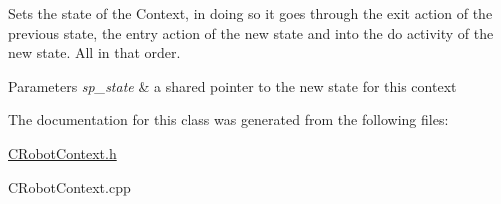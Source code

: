Sets the state of the Context, in doing so it goes through the exit action of the previous state, the entry action of the new state and into the do activity of the new state. All in that order. 


\begin{DoxyParams}{Parameters}
{\em sp\+\_\+state} & a shared pointer to the new state for this context \\
\hline
\end{DoxyParams}


The documentation for this class was generated from the following files\+:\begin{DoxyCompactItemize}
\item 
\hyperlink{CRobotContext_8h}{C\+Robot\+Context.\+h}\item 
C\+Robot\+Context.\+cpp\end{DoxyCompactItemize}
